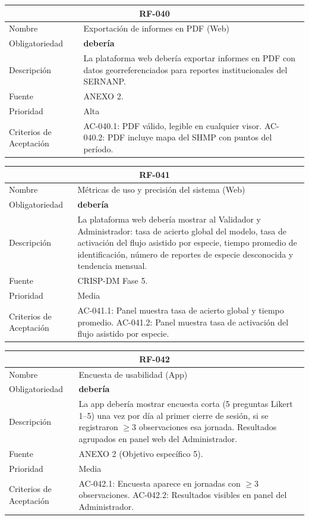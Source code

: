 \documentclass[12pt, a4paper]{article}
\begin{document}
\begin{longtable}{|p{3cm}|p{11.5cm}|}
\hline
\multicolumn{2}{|c|}{\textbf{RF-040}} \\
\hline
Nombre & Exportaci\'on de informes en PDF (Web) \\
\hline
Obligatoriedad & \textbf{deber\'ia} \\
\hline
Descripci\'on & La plataforma web deber\'ia exportar informes en PDF con datos georreferenciados para reportes institucionales del SERNANP. \\
\hline
Fuente & ANEXO 2. \\
\hline
Prioridad & Alta \\
\hline
Criterios de Aceptaci\'on &
AC-040.1: PDF v\'alido, legible en cualquier visor. \newline
AC-040.2: PDF incluye mapa del SHMP con puntos del per\'iodo. \\
\hline
\end{longtable}

\begin{longtable}{|p{3cm}|p{11.5cm}|}
\hline
\multicolumn{2}{|c|}{\textbf{RF-041}} \\
\hline
Nombre & M\'etricas de uso y precisi\'on del sistema (Web) \\
\hline
Obligatoriedad & \textbf{deber\'ia} \\
\hline
Descripci\'on & La plataforma web deber\'ia mostrar al Validador y Administrador: tasa de acierto global del modelo, tasa de activaci\'on del flujo asistido por especie, tiempo promedio de identificaci\'on, n\'umero de reportes de especie desconocida y tendencia mensual. \\
\hline
Fuente & CRISP-DM Fase 5. \\
\hline
Prioridad & Media \\
\hline
Criterios de Aceptaci\'on &
AC-041.1: Panel muestra tasa de acierto global y tiempo promedio. \newline
AC-041.2: Panel muestra tasa de activaci\'on del flujo asistido por especie. \\
\hline
\end{longtable}

\begin{longtable}{|p{3cm}|p{11.5cm}|}
\hline
\multicolumn{2}{|c|}{\textbf{RF-042}} \\
\hline
Nombre & Encuesta de usabilidad (App) \\
\hline
Obligatoriedad & \textbf{deber\'ia} \\
\hline
Descripci\'on & La app deber\'ia mostrar encuesta corta (5 preguntas Likert 1--5) una vez por d\'ia al primer cierre de sesi\'on, si se registraron $\geq$3 observaciones esa jornada. Resultados agrupados en panel web del Administrador. \\
\hline
Fuente & ANEXO 2 (Objetivo espec\'ifico 5). \\
\hline
Prioridad & Media \\
\hline
Criterios de Aceptaci\'on &
AC-042.1: Encuesta aparece en jornadas con $\geq$3 observaciones. \newline
AC-042.2: Resultados visibles en panel del Administrador. \\
\hline
\end{longtable}
\end{document}
